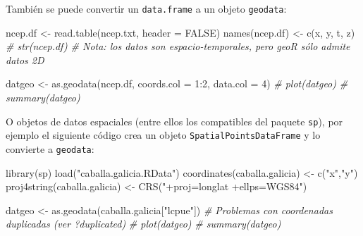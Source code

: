\documentclass[
  spanish,
]{book}
\newenvironment{Shaded}{\begin{snugshade}}{\end{snugshade}}
\newcommand{\AttributeTok}[1]{\textcolor[rgb]{0.77,0.63,0.00}{#1}}
\newcommand{\CommentTok}[1]{\textcolor[rgb]{0.56,0.35,0.01}{\textit{#1}}}
\newcommand{\ConstantTok}[1]{\textcolor[rgb]{0.00,0.00,0.00}{#1}}
\newcommand{\DecValTok}[1]{\textcolor[rgb]{0.00,0.00,0.81}{#1}}
\newcommand{\FunctionTok}[1]{\textcolor[rgb]{0.00,0.00,0.00}{#1}}
\newcommand{\NormalTok}[1]{#1}
\newcommand{\OtherTok}[1]{\textcolor[rgb]{0.56,0.35,0.01}{#1}}
\newcommand{\SpecialCharTok}[1]{\textcolor[rgb]{0.00,0.00,0.00}{#1}}
\newcommand{\StringTok}[1]{\textcolor[rgb]{0.31,0.60,0.02}{#1}}
\theoremstyle{break}
\theoremstyle{definition}
\theoremstyle{definition}
\theoremstyle{definition}
\theoremstyle{definition}
\theoremstyle{remark}
\begin{document}
También se puede convertir un \texttt{data.frame} a un objeto \texttt{geodata}:

\begin{Shaded}
\begin{Highlighting}[]
\NormalTok{ncep.df }\OtherTok{\textless{}{-}} \FunctionTok{read.table}\NormalTok{(}\StringTok{\textquotesingle{}ncep.txt\textquotesingle{}}\NormalTok{, }\AttributeTok{header =} \ConstantTok{FALSE}\NormalTok{)}
\FunctionTok{names}\NormalTok{(ncep.df) }\OtherTok{\textless{}{-}} \FunctionTok{c}\NormalTok{(}\StringTok{\textquotesingle{}x\textquotesingle{}}\NormalTok{, }\StringTok{\textquotesingle{}y\textquotesingle{}}\NormalTok{, }\StringTok{\textquotesingle{}t\textquotesingle{}}\NormalTok{, }\StringTok{\textquotesingle{}z\textquotesingle{}}\NormalTok{)}
\CommentTok{\# str(ncep.df)}
\CommentTok{\# Nota: los datos son espacio{-}temporales, pero geoR sólo admite datos 2D}

\NormalTok{datgeo }\OtherTok{\textless{}{-}} \FunctionTok{as.geodata}\NormalTok{(ncep.df, }\AttributeTok{coords.col =} \DecValTok{1}\SpecialCharTok{:}\DecValTok{2}\NormalTok{, }\AttributeTok{data.col =} \DecValTok{4}\NormalTok{)}
\CommentTok{\# plot(datgeo)}
\CommentTok{\# summary(datgeo)}
\end{Highlighting}
\end{Shaded}

O objetos de datos espaciales (entre ellos los compatibles del paquete \texttt{sp}),
por ejemplo el siguiente código crea un objeto \texttt{SpatialPointsDataFrame}
y lo convierte a \texttt{geodata}:

\begin{Shaded}
\begin{Highlighting}[]
\FunctionTok{library}\NormalTok{(sp)}
\FunctionTok{load}\NormalTok{(}\StringTok{"caballa.galicia.RData"}\NormalTok{)}
\FunctionTok{coordinates}\NormalTok{(caballa.galicia) }\OtherTok{\textless{}{-}} \FunctionTok{c}\NormalTok{(}\StringTok{"x"}\NormalTok{,}\StringTok{"y"}\NormalTok{)}
\FunctionTok{proj4string}\NormalTok{(caballa.galicia) }\OtherTok{\textless{}{-}} \FunctionTok{CRS}\NormalTok{(}\StringTok{"+proj=longlat +ellps=WGS84"}\NormalTok{)}

\NormalTok{datgeo }\OtherTok{\textless{}{-}} \FunctionTok{as.geodata}\NormalTok{(caballa.galicia[}\StringTok{"lcpue"}\NormalTok{])}
\CommentTok{\# Problemas con coordenadas duplicadas  (ver ?duplicated)}
\CommentTok{\# plot(datgeo)}
\CommentTok{\# summary(datgeo)     }
\end{Highlighting}
\end{Shaded}
\end{document}
